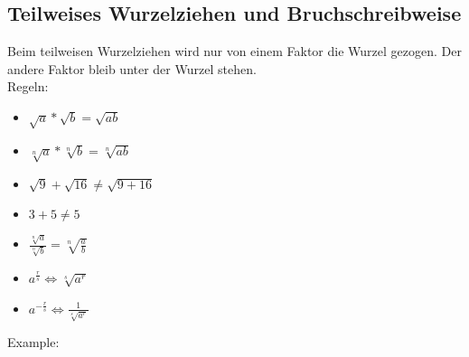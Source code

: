 \newpage
\subsection{Teilweises Wurzelziehen und Bruchschreibweise}


\hfill \break
Beim teilweisen Wurzelziehen wird nur von einem Faktor die Wurzel gezogen. Der andere Faktor bleib unter der Wurzel stehen.\\

\hfill \break
Regeln:\\
\begin{itemize}
    \item $\sqrt{a}* \sqrt{b} = \sqrt{ab}$
    \item $\sqrt[n]{a}* \sqrt[n]{b} = \sqrt[n]{ab}$
    \item $\sqrt{9}+ \sqrt{16} \neq  \sqrt{9+16}$
    \item $3+5 \neq 5$
    \item $\frac{\sqrt[n]{a}}{\sqrt[n]{b}} = \sqrt[n]{\frac{a}{b}}$
    \item $a^\frac{r}{s} \Leftrightarrow  \sqrt[s]{a^r}$
    \item $a^{-\frac{r}{s}} \Leftrightarrow  \frac{1}{\sqrt[s]{a^r}}$
\end{itemize}

\hfill \break
Example:\\
\fboxrule=0.8pt 